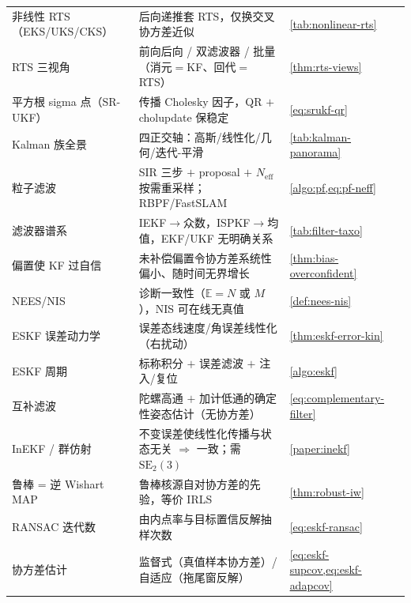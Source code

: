 \begin{table}[H]
\begin{tabular}{lll}
非线性 RTS（EKS/UKS/CKS） & 后向递推套 RTS，仅换交叉协方差近似 & \cref{tab:nonlinear-rts} \\
RTS 三视角 & 前向后向 / 双滤波器 / 批量（消元$=$KF、回代$=$RTS） & \cref{thm:rts-views} \\
平方根 sigma 点（SR-UKF） & 传播 Cholesky 因子，QR $+$ cholupdate 保稳定 & \cref{eq:srukf-qr} \\
Kalman 族全景 & 四正交轴：高斯/线性化/几何/迭代-平滑 & \cref{tab:kalman-panorama} \\
粒子滤波 & SIR 三步 $+$ proposal $+$ $N_{\text{eff}}$ 按需重采样；RBPF/FastSLAM & \cref{algo:pf,eq:pf-neff} \\
滤波器谱系 & IEKF$\to$众数，ISPKF$\to$均值，EKF/UKF 无明确关系 & \cref{tab:filter-taxo} \\
偏置使 KF 过自信 & 未补偿偏置令协方差系统性偏小、随时间无界增长 & \cref{thm:bias-overconfident} \\
NEES/NIS & 诊断一致性（$\mathbb{E}=N$ 或 $M$），NIS 可在线无真值 & \cref{def:nees-nis} \\
ESKF 误差动力学 & 误差态线速度/角误差线性化（右扰动） & \cref{thm:eskf-error-kin} \\
ESKF 周期 & 标称积分 $+$ 误差滤波 $+$ 注入/复位 & \cref{algo:eskf} \\
互补滤波 & 陀螺高通 $+$ 加计低通的确定性姿态估计（无协方差） & \cref{eq:complementary-filter} \\
InEKF / 群仿射 & 不变误差使线性化传播与状态无关 $\Rightarrow$ 一致；需 $\mathrm{SE}_2(3)$ & \cref{paper:inekf} \\
鲁棒 = 逆 Wishart MAP & 鲁棒核源自对协方差的先验，等价 IRLS & \cref{thm:robust-iw} \\
RANSAC 迭代数 & 由内点率与目标置信反解抽样次数 & \cref{eq:eskf-ransac} \\
协方差估计 & 监督式（真值样本协方差）/ 自适应（拖尾窗反解） & \cref{eq:eskf-supcov,eq:eskf-adapcov} \\
\bottomrule
\end{tabular}
\end{table}

